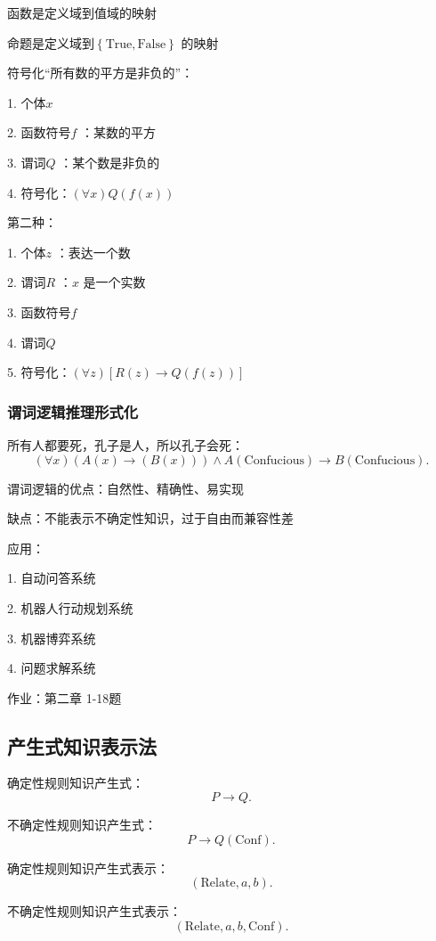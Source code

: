 函数是定义域到值域的映射

命题是定义域到$\left\{ \text{True},\text{False} \right\} $ 的映射
\begin{eg}
	符号化“所有数的平方是非负的”：

	1. 个体$x$

	2. 函数符号$f$ ：某数的平方

	3. 谓词$Q$ ：某个数是非负的

	4. 符号化：$\left( \forall x \right) Q\left( f\left( x \right)  \right) $ 

	第二种：

	1. 个体$z$ ：表达一个数

	2. 谓词$R$ ：$x$ 是一个实数

	3. 函数符号$f$ 

	4. 谓词$Q$ 

	5. 符号化：$\left( \forall z \right) [R\left( z \right) \to Q\left( f\left( z \right)  \right)] $
\end{eg}

\subsubsection*{谓词逻辑推理形式化}%
\label{subsub:谓词逻辑推理形式化}
\begin{eg}
	所有人都要死，孔子是人，所以孔子会死：
	\[
		\left( \forall x \right) \left( A\left( x \right) \to \left( B\left( x \right)  \right)  \right) \land A\left( \text{Confucious} \right) \to B\left( \text{Confucious} \right) 
	.\] 
\end{eg}

\begin{notation}
	谓词逻辑的优点：自然性、精确性、易实现

	缺点：不能表示不确定性知识，过于自由而兼容性差

	应用：

	1. 自动问答系统

	2. 机器人行动规划系统

	3. 机器博弈系统

	4. 问题求解系统
\end{notation}
作业：第二章 1-18题
\subsection{产生式知识表示法}%
\label{sub:产生式知识表示法}
\begin{notation}
	确定性规则知识产生式：
	\[
		P\to Q
	.\] 
	
	不确定性规则知识产生式：
	\[
		P\to Q \left( \text{Conf} \right) 
	.\] 

	确定性规则知识产生式表示：
	\[
		\left( \text{Relate},a,b \right) 
	.\] 

	不确定性规则知识产生式表示：
	\[
		\left( \text{Relate},a,b,\text{Conf} \right) 
	.\] 
\end{notation}


